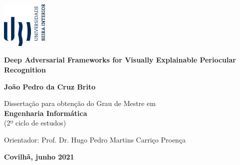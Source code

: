 \begin{titlepage}
\begin{center}

\begin{flushright}
 \includegraphics[height=2.22cm]{figures/logoubi.png}\\


\vspace{7.6cm}

\rostotitulo \textbf{Deep Adversarial Frameworks for Visually Explainable Periocular Recognition} \\

\vspace{1.8cm}

\rostonomes \textbf{João Pedro da Cruz Brito}\\

\vspace{1.4cm}

\rostooutros Dissertação para obtenção do Grau de Mestre em\\
\rostonomes \textbf{Engenharia Informática}\\
\rostooutros (2º ciclo de estudos)\\

\vspace{3.3cm}

\rostooutros Orientador: Prof. Dr. Hugo Pedro Martins Carriço Proença\\

\vspace{1.4cm}

\rostooutros \textbf{Covilhã, junho 2021}
\end{flushright}

\end{center}
\end{titlepage}

